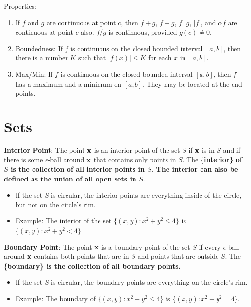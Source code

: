 \documentclass[]{book}
\providecommand{\tightlist}{%
  \setlength{\itemsep}{0pt}\setlength{\parskip}{0pt}}
\theoremstyle{definition}
\theoremstyle{definition}
\theoremstyle{definition}
\theoremstyle{remark}
\begin{document}
Properties:

\begin{enumerate}
\def\labelenumi{\arabic{enumi}.}
\tightlist
\item
  If \(f\) and \(g\) are continuous at point \(c\), then \(f+g\),
  \(f-g\), \(f \cdot g\), \(|f|\), and \(\alpha f\) are continuous at
  point \(c\) also. \(f/g\) is continuous, provided \(g(c)\ne 0\).
\item
  Boundedness: If \(f\) is continuous on the closed bounded interval
  \([a,b]\), then there is a number \(K\) such that \(|f(x)|\le K\) for
  each \(x\) in \([a,b]\).
\item
  Max/Min: If \(f\) is continuous on the closed bounded interval
  \([a,b]\), then \(f\) has a maximum and a minimum on \([a,b]\). They
  may be located at the end points.
\end{enumerate}

\section{Sets}\label{sets}

\textbf{Interior Point}: The point \(\bf x\) is an interior point of the
set \(S\) if \(\bf x\) is in \(S\) and if there is some
\(\epsilon\)-ball around \(\bf x\) that contains only points in \(S\).
The \{\bf interior\} of \(S\) is the collection of all interior points
in \(S\). The interior can also be defined as the union of all open sets
in \(S\).

\begin{itemize}
\tightlist
\item
  If the set \(S\) is circular, the interior points are everything
  inside of the circle, but not on the circle's rim.
\item
  Example: The interior of the set \(\{ (x,y) : x^2+y^2\le 4 \}\) is
  \(\{ (x,y) : x^2+y^2< 4 \}\) .
\end{itemize}

\textbf{Boundary Point}: The point \(\bf x\) is a boundary point of the
set \(S\) if every \(\epsilon\)-ball around \(\bf x\) contains both
points that are in \(S\) and points that are outside \(S\). The
\{\bf boundary\} is the collection of all boundary points.

\begin{itemize}
\tightlist
\item
  If the set \(S\) is circular, the boundary points are everything on
  the circle's rim.
\item
  Example: The boundary of \(\{ (x,y) : x^2+y^2\le 4 \}\) is
  \(\{ (x,y) : x^2+y^2 = 4 \}\).
\end{itemize}
\end{document}
